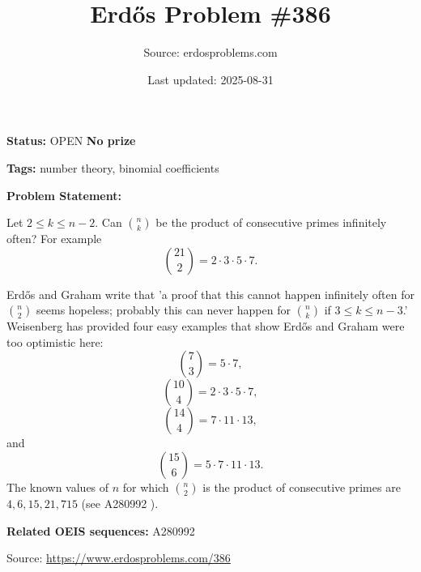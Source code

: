 \documentclass{article}
\title{Erd\H{o}s Problem \#386}
\date{Last updated: 2025-08-31}
\author{Source: erdosproblems.com}
\begin{document}
\maketitle

\noindent\textbf{Status:} OPEN \quad \textbf{No prize}

\noindent\textbf{Tags:} number theory, binomial coefficients

\medskip

\noindent\textbf{Problem Statement:}

Let $2\leq k\leq n-2$. Can $\binom{n}{k}$ be the product of consecutive primes infinitely often? For example\[\binom{21}{2}=2\cdot 3\cdot 5\cdot 7.\]




Erd\H{o}s and Graham write that 'a proof that this cannot happen infinitely often for $\binom{n}{2}$ seems hopeless; probably this can never happen for $\binom{n}{k}$ if $3\leq k\leq n-3$.' Weisenberg has provided four easy examples that show Erd\H{o}s and Graham were too optimistic here:\[\binom{7}{3}=5\cdot 7,\]\[\binom{10}{4}= 2\cdot 3\cdot 5\cdot 7,\]\[\binom{14}{4} = 7\cdot 11\cdot 13,\]and\[\binom{15}{6}=5\cdot 7\cdot 11\cdot 13.\]The known values of $n$ for which $\binom{n}{2}$ is the product of consecutive primes are $4,6,15,21,715$ (see A280992 ).

\noindent\textbf{Related OEIS sequences:} A280992


\bigskip
\noindent\small{Source: \url{https://www.erdosproblems.com/386}}
\end{document}
